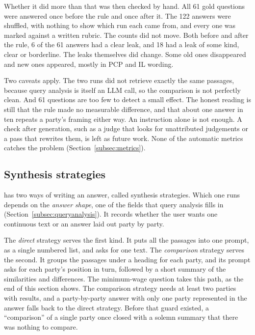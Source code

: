 Whether it did more than that was then checked by hand. All 61 gold questions
were answered once before the rule and once after it. The 122 answers were
shuffled, with nothing to show which run each came from, and every one was
marked against a written rubric. The counts did not move. Both before and after
the rule, 6 of the 61 answers had a clear leak, and 18 had a leak of some kind,
clear or borderline. The leaks themselves did change. Some old ones
disappeared and new ones appeared, mostly in PCP and IL wording.

Two caveats apply. The two runs did not retrieve exactly the same passages,
because query analysis is itself an LLM call, so the comparison is not
perfectly clean. And 61 questions are too few to detect a small effect. The
honest reading is still that the rule made no measurable difference, and that
about one answer in ten repeats a party's framing either way. An instruction
alone is not enough. A check after generation, such as a judge that looks for
unattributed judgements or a pass that rewrites them, is left as future work.
None of the automatic metrics catches the problem
(Section~\ref{subsec:metrics}).

\subsection{Synthesis strategies} \label{subsec:synthesis}

\sysname{} has two ways of writing an answer, called synthesis strategies.
Which one runs depends on the \emph{answer shape}, one of the fields that query
analysis fills in (Section~\ref{subsec:queryanalysis}). It records whether the
user wants one continuous text or an answer laid out party by party.

The \emph{direct} strategy serves the first kind. It puts all the passages
into one prompt, as a single numbered list, and asks for one text. The
\emph{comparison} strategy serves the second. It groups the passages under a
heading for each party, and its prompt asks for each party's position in turn,
followed by a short summary of the similarities and differences. The minimum-wage
question takes this path, as the end of this section shows. The comparison
strategy needs at least two parties with results, and a party-by-party answer
with only one party represented in the answer falls back to the direct strategy.
Before that guard existed, a ``comparison'' of a single party once closed with a
solemn summary that there was nothing to compare.

